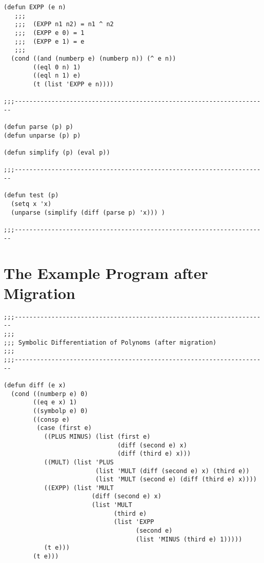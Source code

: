 \begin{appendix}
\begin{verbatim}
(defun EXPP (e n)
   ;;;
   ;;;  (EXPP n1 n2) = n1 ^ n2
   ;;;  (EXPP e 0) = 1
   ;;;  (EXPP e 1) = e
   ;;;
  (cond ((and (numberp e) (numberp n)) (^ e n))
        ((eql 0 n) 1)
        ((eql n 1) e)
        (t (list 'EXPP e n))))

;;;---------------------------------------------------------------------

(defun parse (p) p)
(defun unparse (p) p)

(defun simplify (p) (eval p))

;;;---------------------------------------------------------------------

(defun test (p)
  (setq x 'x)
  (unparse (simplify (diff (parse p) 'x))) )

;;;---------------------------------------------------------------------
\end{verbatim}

\newpage
\section{The Example Program after Migration}

\begin{verbatim}
;;;---------------------------------------------------------------------
;;;
;;; Symbolic Differentiation of Polynoms (after migration)
;;;
;;;---------------------------------------------------------------------

(defun diff (e x)
  (cond ((numberp e) 0)
        ((eq e x) 1)
        ((symbolp e) 0)
        ((consp e)
         (case (first e)
           ((PLUS MINUS) (list (first e) 
                               (diff (second e) x) 
                               (diff (third e) x)))
           ((MULT) (list 'PLUS
                         (list 'MULT (diff (second e) x) (third e))
                         (list 'MULT (second e) (diff (third e) x))))
           ((EXPP) (list 'MULT
                        (diff (second e) x)
                        (list 'MULT
                              (third e)
                              (list 'EXPP 
                                    (second e) 
                                    (list 'MINUS (third e) 1)))))
           (t e)))
        (t e)))
  

\end{verbatim}
\end{appendix}
